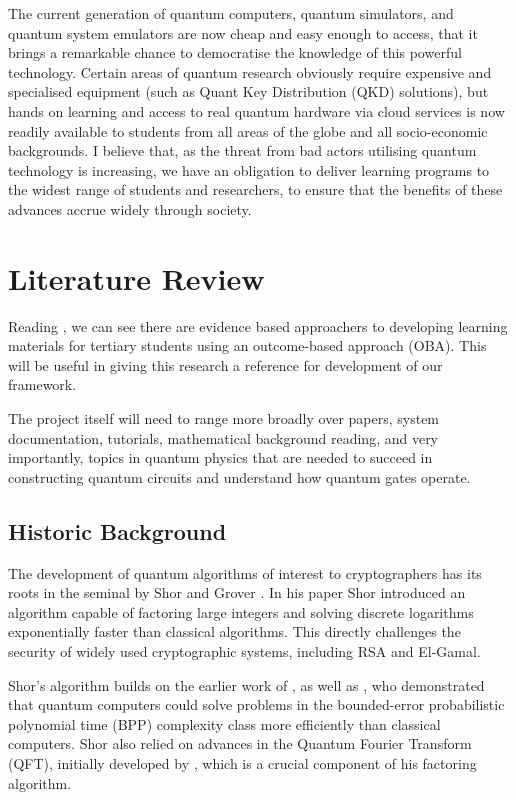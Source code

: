 \documentclass[11pt,a4paper]{article}
\begin{document}
The current generation of quantum computers, quantum simulators, and quantum system emulators are now cheap and easy enough to access, that 
it brings a remarkable chance to democratise the knowledge of this powerful technology.  Certain areas of quantum research obviously require
expensive and specialised equipment (such as Quant Key Distribution (QKD) solutions), but hands on learning and access to real quantum hardware
via cloud services is now readily available to students from all areas of the globe and all socio-economic backgrounds.  I believe that,
as the threat from bad actors utilising quantum technology is increasing, we have an obligation to deliver learning programs to the widest
range of students and researchers, to ensure that the benefits of these advances accrue widely through society.

\section{Literature Review}

Reading  \cite{Wong:2011}, we can see there are evidence based approachers to developing learning materials for tertiary 
students using an outcome-based approach (OBA).  This will be useful in giving this research a reference for development of our framework.

The project itself will need to range more broadly over papers, system documentation, tutorials, mathematical background reading, 
and very importantly, topics in quantum physics that are needed to succeed in constructing quantum circuits and understand how
quantum gates operate.

\subsection{Historic Background}

The development of quantum algorithms of interest to cryptographers has its roots in the seminal by Shor \cite{Shor:1997} and Grover \cite{Grover:1996}.
In his paper  Shor introduced an algorithm capable of factoring large integers and solving discrete logarithms 
exponentially faster than classical algorithms.  This directly challenges the security of widely used cryptographic systems, including RSA and El-Gamal.

Shor’s algorithm builds on the earlier work of \citeauthor{Deutsch:1992} \cite{Deutsch:1992}, as well as \citeauthor{Berthiaume:1992} 
\cite{Berthiaume:1992}, who demonstrated that quantum computers could solve problems in the bounded-error probabilistic polynomial time (BPP) 
complexity class more efficiently than classical computers.
Shor also relied on advances in the Quantum Fourier Transform (QFT), initially developed by \citeauthor{Coppersmith:1994} \cite{Coppersmith:1994},
which is a crucial component of his factoring algorithm.
\end{document}
